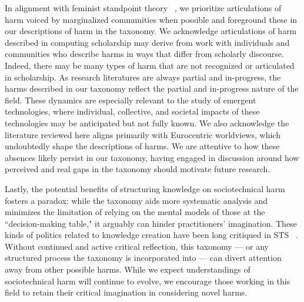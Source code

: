 In alignment with feminist standpoint theory ~\cite{harding1991whose, harding1986science}, we prioritize articulations of harm voiced by marginalized communities when possible and foreground these in our descriptions of harm in the taxonomy. We acknowledge articulations of harm described in computing scholarship may derive from work with individuals and communities who describe harms in ways that differ from scholarly discourse. Indeed, there may be many types of harm that are not recognized or articulated in scholarship. As research literatures are always partial and in-progress, the harms described in our taxonomy reflect the partial and in-progress nature of the field. These dynamics are especially relevant to the study of emergent technologies, where individual, collective, and societal impacts of these technologies may be anticipated but not fully known. We also acknowledge the literature reviewed here aligns primarily with Eurocentric worldviews, which undoubtedly shape the descriptions of harms. We are attentive to how these absences likely persist in our taxonomy, having engaged in discussion around how perceived and real gaps in the taxonomy should motivate future research. 

Lastly, the potential benefits of structuring knowledge on sociotechnical harm fosters a paradox: while the taxonomy aids more systematic analysis and minimizes the limitation of relying on the mental models of those at the ``decision-making table," it arguably can hinder practitioners' imagination. These kinds of politics related to knowledge creation have been long critiqued in STS ~\cite{HarawaySituated1988, harding1986science, cetina1999epistemic, fuller1993helen}. Without continued and active critical reflection, this taxonomy — or any structured process the taxonomy is incorporated into — can divert attention away from other possible harms. While we expect understandings of sociotechnical harm will continue to evolve, we encourage those working in this field to retain their critical imagination in considering novel harms. 


